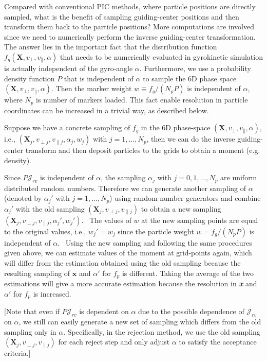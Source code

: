 \documentclass{llncs}
\newcommand{\tmem}[1]{{\em #1\/}}
\newcommand{\tmstrong}[1]{\textbf{#1}}
\begin{document}
Compared with conventional PIC methods, where particle positions are directly
sampled, what is the benefit of sampling guiding-center positions and then
transform them back to the particle positions? More computations are involved
since we need to numerically perform the inverse guiding-center
transformation. The answer lies in the important fact that the distribution
function $f_g (\mathbf{X}, v_{\perp}, v_{\parallel}, \alpha)$ that needs to be
numerically evaluated in gyrokinetic simulation is actually independent of the
gyro-angle $\alpha$. Furthermore, we use a probability density function $P$
that is independent of $\alpha$ to sample the 6D phase space $(\mathbf{X},
v_{\perp}, v_{\parallel}, \alpha)$. Then the marker weight $w \equiv f_g /
(N_p P)$ is independent of $\alpha$, where $N_p$ is number of markers loaded.
This fact enable resolution in particle coordinates can be increased in a
trivial way, as described below.

Suppose we have a concrete sampling of $f_g$ in the 6D phase-space
$(\mathbf{X}, v_{\perp}, v_{\parallel}, \alpha)$, i.e., $(\mathbf{X}_j,
v_{\perp j}, v_{\parallel j}, \alpha_j, w_j)$ with $j = 1, \ldots, N_p$, then
we can do the inverse guiding-center transform and then deposit particles to
the grids to obtain a moment (e.g. density).

Since $P \mathcal{J}_{r v}$ is independent of $\alpha$, the sampling
$\alpha_j$ with $j = 0, 1, \ldots, N_p$ are uniform distributed random
numbers. Therefore we can generate another sampling of $\alpha$ (denoted by
$\alpha_j'$ with $j = 1, \ldots, N_p$) using random number generators and
combine $\alpha_j'$ with the old sampling $(\mathbf{X}_j, v_{\perp j},
v_{\parallel j})$ to obtain a new sampling $(\mathbf{X}_j, v_{\perp j},
v_{\parallel j}, \alpha_j', w_j')$. \ The values of $w$ at the new sampling
points are equal to the original values, i.e., $w_j' = w_j$ since the particle
weight $w = f_g / (N_p P)$ is independent of $\alpha$. \ Using the new
sampling and following the same procedures given above, we can estimate values
of the moment at grid-points again, which will differ from the estimation
obtained using the old sampling because the resulting sampling of $\mathbf{x}$
and $\alpha'$ for $f_p$ is different. Taking the average of the two
estimations will give a more accurate estimation because the resolution in
{\tmstrong{{\tmem{x}}}} and $\alpha'$ for $f_p$ is increased.

[Note that even if $P \mathcal{J}_{r v}$ is dependent on $\alpha$ due to the
possible dependence of $\mathcal{J}_{r v}$ on $\alpha$, we still can easily
generate a new set of sampling which differs from the old sampling only in
$\alpha$. Specifically, in the rejection method, we use the old sampling
$(\mathbf{X}_j, v_{\perp j}, v_{\parallel j})$ for each reject step and only
adjust $\alpha$ to satisfy the acceptance criteria.]
\end{document}
